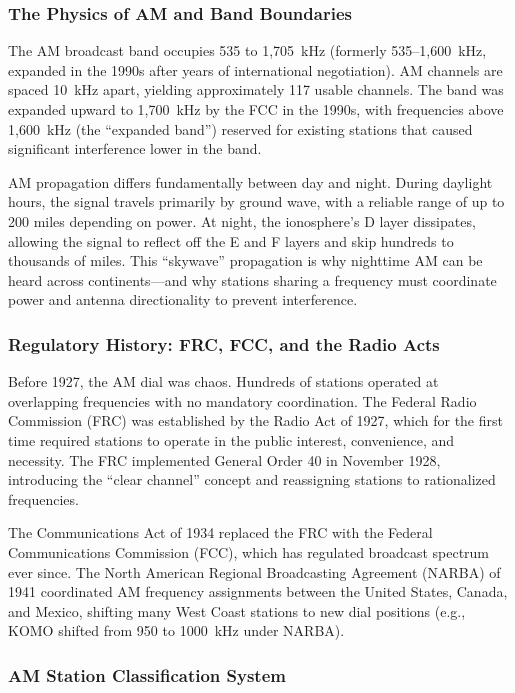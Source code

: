 \documentclass[11pt,letterpaper]{article}
\begin{document}
\begin{asciibox}
\subsubsection{The Physics of AM and Band Boundaries}

The AM broadcast band occupies 535 to 1,705~kHz (formerly 535--1,600~kHz, expanded in the 1990s
after years of international negotiation). AM channels are spaced 10~kHz apart, yielding
approximately 117 usable channels. The band was expanded upward to 1,700~kHz by the FCC in the
1990s, with frequencies above 1,600~kHz (the ``expanded band'') reserved for existing stations
that caused significant interference lower in the band.

AM propagation differs fundamentally between day and night. During daylight hours, the signal
travels primarily by ground wave, with a reliable range of up to 200 miles depending on power.
At night, the ionosphere's D layer dissipates, allowing the signal to reflect off the E and F
layers and skip hundreds to thousands of miles. This ``skywave'' propagation is why nighttime AM
can be heard across continents---and why stations sharing a frequency must coordinate power and
antenna directionality to prevent interference.

\subsubsection{Regulatory History: FRC, FCC, and the Radio Acts}

Before 1927, the AM dial was chaos. Hundreds of stations operated at overlapping frequencies
with no mandatory coordination. The Federal Radio Commission (FRC) was established by the Radio
Act of 1927, which for the first time required stations to operate in the public interest,
convenience, and necessity. The FRC implemented General Order 40 in November 1928, introducing
the ``clear channel'' concept and reassigning stations to rationalized frequencies.

The Communications Act of 1934 replaced the FRC with the Federal Communications Commission
(FCC), which has regulated broadcast spectrum ever since. The North American Regional Broadcasting
Agreement (NARBA) of 1941 coordinated AM frequency assignments between the United States, Canada,
and Mexico, shifting many West Coast stations to new dial positions (e.g., KOMO shifted from
950 to 1000~kHz under NARBA).

\subsubsection{AM Station Classification System}


\end{asciibox}
\end{document}
